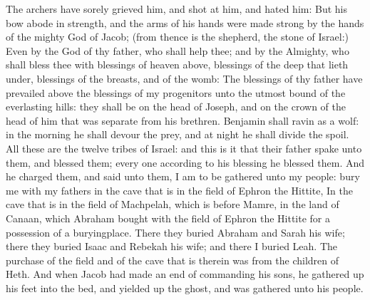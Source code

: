 \begin{biblechapter}
\verse The archers have sorely grieved him, and shot at him, and hated him:
\verse But his bow abode in strength, and the arms of his hands were made strong by the hands of the mighty God of Jacob; (from thence is the shepherd, the stone of Israel:)
\verse Even by the God of thy father, who shall help thee; and by the Almighty, who shall bless thee with blessings of heaven above, blessings of the deep that lieth under, blessings of the breasts, and of the womb:
\verse The blessings of thy father have prevailed above the blessings of my progenitors unto the utmost bound of the everlasting hills: they shall be on the head of Joseph, and on the crown of the head of him that was separate from his brethren.
\verse Benjamin shall ravin as a wolf: in the morning he shall devour the prey, and at night he shall divide the spoil.
\verse All these are the twelve tribes of Israel: and this is it that their father spake unto them, and blessed them; every one according to his blessing he blessed them.
 And he charged them, and said unto them, I am to be gathered unto my people: bury me with my fathers in the cave that is in the field of Ephron the Hittite,
\verse In the cave that is in the field of Machpelah, which is before Mamre, in the land of Canaan, which Abraham bought with the field of Ephron the Hittite for a possession of a buryingplace.
\verse There they buried Abraham and Sarah his wife; there they buried Isaac and Rebekah his wife; and there I buried Leah.
\verse The purchase of the field and of the cave that is therein was from the children of Heth.
\verse And when Jacob had made an end of commanding his sons, he gathered up his feet into the bed, and yielded up the ghost, and was gathered unto his people.
\end{biblechapter}


